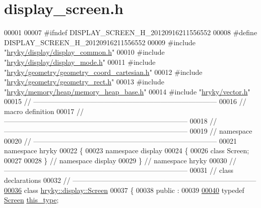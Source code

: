\hypertarget{display__screen_8h_source}{\section{display\-\_\-screen.\-h}
}

\begin{DoxyCode}
00001 
00007 \textcolor{preprocessor}{#ifndef DISPLAY\_SCREEN\_H\_20120916211556552}
00008 \textcolor{preprocessor}{}\textcolor{preprocessor}{#define DISPLAY\_SCREEN\_H\_20120916211556552}
00009 \textcolor{preprocessor}{}\textcolor{preprocessor}{#include "\hyperlink{display__common_8h}{hryky/display/display_common.h}"}
00010 \textcolor{preprocessor}{#include "\hyperlink{display__mode_8h}{hryky/display/display_mode.h}"}
00011 \textcolor{preprocessor}{#include "\hyperlink{geometry__coord__cartesian_8h}{hryky/geometry/geometry_coord_cartesian.h}"}
00012 \textcolor{preprocessor}{#include "\hyperlink{geometry__rect_8h}{hryky/geometry/geometry_rect.h}"}
00013 \textcolor{preprocessor}{#include "\hyperlink{memory__heap__base_8h}{hryky/memory/heap/memory_heap_base.h}"}
00014 \textcolor{preprocessor}{#include "\hyperlink{vector_8h}{hryky/vector.h}"}
00015 \textcolor{comment}{//
      ------------------------------------------------------------------------------}
00016 \textcolor{comment}{// macro definition}
00017 \textcolor{comment}{//
      ------------------------------------------------------------------------------}
00018 \textcolor{comment}{//
      ------------------------------------------------------------------------------}
00019 \textcolor{comment}{// namespace}
00020 \textcolor{comment}{//
      ------------------------------------------------------------------------------}
00021 \textcolor{keyword}{namespace }hryky
00022 \{
00023 \textcolor{keyword}{namespace }display
00024 \{
00026     \textcolor{keyword}{class }Screen;
00027 
00028 \} \textcolor{comment}{// namespace display}
00029 \} \textcolor{comment}{// namespace hryky}
00030 \textcolor{comment}{//
      ------------------------------------------------------------------------------}
00031 \textcolor{comment}{// class declarations}
00032 \textcolor{comment}{//
      ------------------------------------------------------------------------------}
\hypertarget{display__screen_8h_source_l00036}{}\hyperlink{classhryky_1_1display_1_1_screen}{00036} \textcolor{comment}{}\textcolor{keyword}{class }\hyperlink{classhryky_1_1display_1_1_screen}{hryky::display::Screen}
00037 \{
00038 \textcolor{keyword}{public} :
00039 
\hypertarget{display__screen_8h_source_l00040}{}\hyperlink{classhryky_1_1display_1_1_screen_a83363e4f31308e9b77bc99f86d659b7b}{00040}     \textcolor{keyword}{typedef} \hyperlink{classhryky_1_1display_1_1_screen}{Screen}                                  \hyperlink{classhryky_1_1display_1_1_screen_a83363e4f31308e9b77bc99f86d659b7b}{this_type};

\end{DoxyCode}
